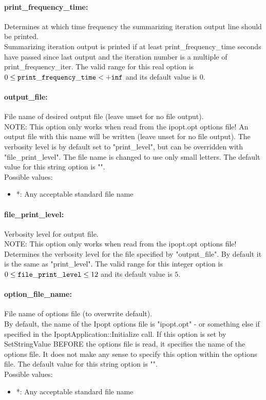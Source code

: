 \paragraph{print\_frequency\_time:}\label{opt:print_frequency_time} Determines at which time frequency the summarizing iteration output line should be printed. \\
 Summarizing iteration output is printed if at
least print\_frequency\_time seconds have passed
since last output and the iteration number is a
multiple of print\_frequency\_iter. The valid range for this real option is 
$0 \le {\tt print\_frequency\_time } <  {\tt +inf}$
and its default value is $0$.


\paragraph{output\_file:}\label{opt:output_file} File name of desired output file (leave unset for no file output). \\
 NOTE: This option only works when read from the
ipopt.opt options file! An output file with this
name will be written (leave unset for no file
output).  The verbosity level is by default set
to "print\_level", but can be overridden with
"file\_print\_level".  The file name is changed
to use only small letters. The default value for this string option is "".
\\ 
Possible values:
\begin{itemize}
   \item *: Any acceptable standard file name
\end{itemize}

\paragraph{file\_print\_level:}\label{opt:file_print_level} Verbosity level for output file. \\
 NOTE: This option only works when read from the
ipopt.opt options file! Determines the verbosity
level for the file specified by "output\_file". 
By default it is the same as "print\_level". The valid range for this integer option is
$0 \le {\tt file\_print\_level } \le 12$
and its default value is $5$.


\paragraph{option\_file\_name:}\label{opt:option_file_name} File name of options file (to overwrite default). \\
 By default, the name of the Ipopt options file is
"ipopt.opt" - or something else if specified in
the IpoptApplication::Initialize call. If this
option is set by SetStringValue BEFORE the
options file is read, it specifies the name of
the options file.  It does not make any sense to
specify this option within the options file. The default value for this string option is "".
\\ 
Possible values:
\begin{itemize}
   \item *: Any acceptable standard file name
\end{itemize}

